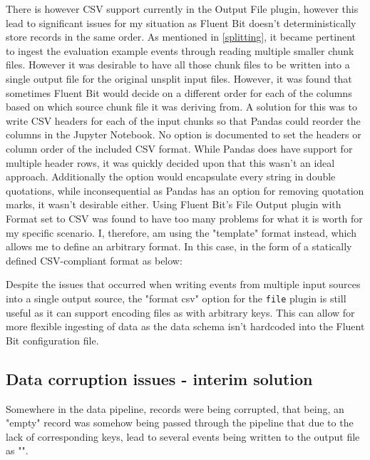 There is however CSV support currently in the Output File plugin, however this lead to significant issues for my situation as Fluent Bit doesn't deterministically store records in the same order. As mentioned in \ref{splitting}, it became pertinent to ingest the evaluation example events through reading multiple smaller chunk files. However it was desirable to have all those chunk files to be written into a single output file for the original unsplit input files. However, it was found that sometimes Fluent Bit would decide on a different order for each of the columns based on which source chunk file it was deriving from. A solution for this was to write CSV headers for each of the input chunks so that Pandas could reorder the columns in the Jupyter Notebook. No option is documented to set the headers or column order of the included CSV format. While Pandas does have support for multiple header rows, it was quickly decided upon that this wasn't an ideal approach. Additionally the option would encapsulate every string in double quotations, while inconsequential as Pandas has an option for removing quotation marks, it wasn't desirable either. Using Fluent Bit's File Output plugin with Format set to CSV was found to have too many problems for what it is worth for my specific scenario. I, therefore, am using the "template" format instead, which allows me to define an arbitrary format. In this case, in the form of a statically defined CSV-compliant format as below:



Despite the issues that occurred when writing events from multiple input sources into a single output source, the "format csv" option for the \texttt{file} plugin is still useful as it can support encoding files as with arbitrary keys. This can allow for more flexible ingesting of data as the data schema isn't hardcoded into the Fluent Bit configuration file.

\subsection{Data corruption issues - interim solution}
Somewhere in the data pipeline, records were being corrupted, that being, an "empty" record was somehow being passed through the pipeline that due to the lack of corresponding keys, lead to several events being written to the output file as "\texttt{}".

